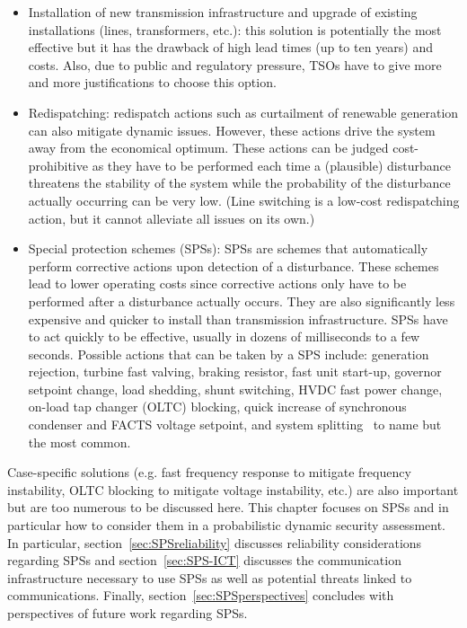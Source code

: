 \begin{itemize}
    \item Installation of new transmission infrastructure and upgrade of existing installations (lines, transformers, etc.): this solution is potentially the most effective but it has the drawback of high lead times (up to ten years) and costs. Also, due to public and regulatory pressure, TSOs have to give more and more justifications to choose this option.
    \item Redispatching: redispatch actions such as curtailment of renewable generation can also mitigate dynamic issues. However, these actions drive the system away from the economical optimum. These actions can be judged cost-prohibitive as they have to be performed each time a (plausible) disturbance threatens the stability of the system while the probability of the disturbance actually occurring can be very low. (Line switching is a low-cost redispatching action, but it cannot alleviate all issues on its own.)
    \item Special protection schemes (SPSs): SPSs are schemes that automatically perform corrective actions upon detection of a disturbance. These schemes lead to lower operating costs since corrective actions only have to be performed after a disturbance actually occurs. They are also significantly less expensive and quicker to install than transmission infrastructure. SPSs have to act quickly to be effective, usually in dozens of milliseconds to a few seconds. Possible actions that can be taken by a SPS include: generation rejection, turbine fast valving, braking resistor, fast unit start-up, governor setpoint change, load shedding, shunt switching, HVDC fast power change, on-load tap changer (OLTC) blocking, quick increase of synchronous condenser and FACTS voltage setpoint, and system splitting~\cite{CigreDefensePlan} to name but the most common.
\end{itemize}

Case-specific solutions (e.g. fast frequency response to mitigate frequency instability, OLTC blocking to mitigate voltage instability, etc.) are also important but are too numerous to be discussed here. This chapter focuses on SPSs and in particular how to consider them in a probabilistic dynamic security assessment. In particular, section~\ref{sec:SPSreliability} discusses reliability considerations regarding SPSs and section~\ref{sec:SPS-ICT} discusses the communication infrastructure necessary to use SPSs as well as potential threats linked to communications. Finally, section~\ref{sec:SPSperspectives} concludes with perspectives of future work regarding SPSs.

